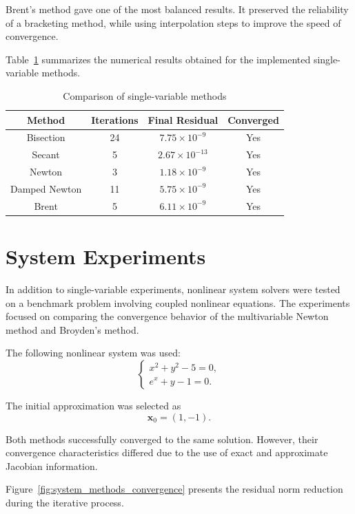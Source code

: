 Brent’s method gave one of the most balanced results. It preserved the reliability of a bracketing method, while using interpolation steps to improve the speed of convergence.

Table~\ref{tab:single_variable_results} summarizes the numerical results obtained for the implemented single-variable methods.

\begin{table}[h!]
\centering
\caption{Comparison of single-variable methods}
\label{tab:single_variable_results}
\begin{tabular}{|c|c|c|c|}
\hline
Method & Iterations & Final Residual & Converged \\ \hline
Bisection & 24 & \(7.75 \times 10^{-9}\) & Yes \\ \hline
Secant & 5 & \(2.67 \times 10^{-13}\) & Yes \\ \hline
Newton & 3 & \(1.18 \times 10^{-9}\) & Yes \\ \hline
Damped Newton & 11 & \(5.75 \times 10^{-9}\) & Yes \\ \hline
Brent & 5 & \(6.11 \times 10^{-9}\) & Yes \\ \hline
\end{tabular}
\end{table}

\section{System Experiments}

In addition to single-variable experiments, nonlinear system solvers were tested on a benchmark problem involving coupled nonlinear equations. The experiments focused on comparing the convergence behavior of the multivariable Newton method and Broyden's method.

The following nonlinear system was used:
\[
\begin{cases}
x^2+y^2-5=0, \\
e^x+y-1=0.
\end{cases}
\]

The initial approximation was selected as
\[
\mathbf{x}_0=(1,-1).
\]

Both methods successfully converged to the same solution. However, their convergence characteristics differed due to the use of exact and approximate Jacobian information.

Figure~\ref{fig:system_methods_convergence} presents the residual norm reduction during the iterative process.

